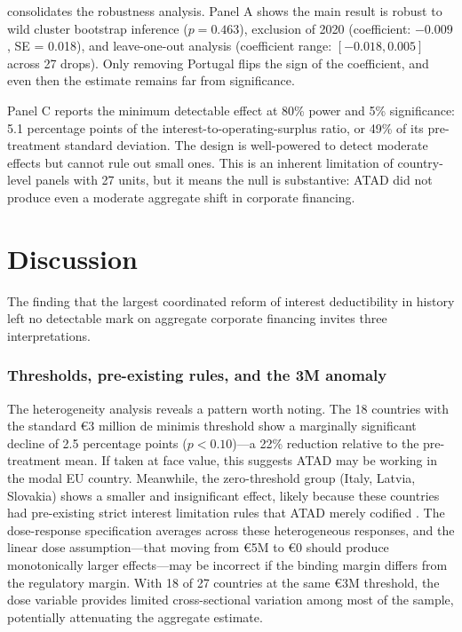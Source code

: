 \documentclass[12pt]{article}
\begin{document}


 consolidates the robustness analysis. Panel A shows the main result is robust to wild cluster bootstrap inference ($p = 0.463$), exclusion of 2020 (coefficient: $-0.009$, SE = 0.018), and leave-one-out analysis (coefficient range: $[-0.018, 0.005]$ across 27 drops). Only removing Portugal flips the sign of the coefficient, and even then the estimate remains far from significance.

Panel C reports the minimum detectable effect at 80\% power and 5\% significance: 5.1 percentage points of the interest-to-operating-surplus ratio, or 49\% of its pre-treatment standard deviation. The design is well-powered to detect moderate effects but cannot rule out small ones. This is an inherent limitation of country-level panels with 27 units, but it means the null is substantive: ATAD did not produce even a moderate aggregate shift in corporate financing.


\section{Discussion}

The finding that the largest coordinated reform of interest deductibility in history left no detectable mark on aggregate corporate financing invites three interpretations.

\subsubsection*{Thresholds, pre-existing rules, and the 3M anomaly} The heterogeneity analysis reveals a pattern worth noting. The 18 countries with the standard \euro{}3 million de minimis threshold show a marginally significant decline of 2.5 percentage points ($p < 0.10$)---a 22\% reduction relative to the pre-treatment mean. If taken at face value, this suggests ATAD may be working in the modal EU country. Meanwhile, the zero-threshold group (Italy, Latvia, Slovakia) shows a smaller and insignificant effect, likely because these countries had pre-existing strict interest limitation rules that ATAD merely codified \citep{fuest2017atad}. The dose-response specification averages across these heterogeneous responses, and the linear dose assumption---that moving from \euro{}5M to \euro{}0 should produce monotonically larger effects---may be incorrect if the binding margin differs from the regulatory margin. With 18 of 27 countries at the same \euro{}3M threshold, the dose variable provides limited cross-sectional variation among most of the sample, potentially attenuating the aggregate estimate.
\end{document}
